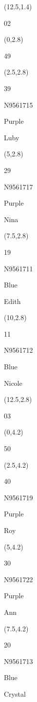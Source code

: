 \documentclass[a4paper]{article}
\newcommand{\myseat}[4]{%
\vspace{-0.1cm}
\parbox[t][2.2cm][t]{3.5cm}{
\small #1 %
\begin{description}
\vspace{-0.1cm}
\item [ID:] #2
\vspace{-0.1cm}
\item [Team:] #3 \normalsize
\vspace{-0.1cm}
\item \normalsize #4
\vspace{-0.1cm}
\end{description}
}
}
\begin{document}
\begin{CJK}{UTF8}{cyberbit}
\begin{textblock}{2.5}(12.5,1.4)
\textblockcolor{}
	\myseat{02}{}{}{}
\end{textblock}

\begin{textblock}{2.5}(0,2.8)
\textblockcolor{}
	\myseat{49}{}{}{}
\end{textblock}

\begin{textblock}{2.5}(2.5,2.8)
	\myseat{39}{N9561715}{Purple}{Luby}
\end{textblock}

\begin{textblock}{2.5}(5,2.8)
	\myseat{29}{N9561717}{Purple}{Nina}
\end{textblock}

\begin{textblock}{2.5}(7.5,2.8)
	\myseat{19}{N9561711}{Blue}{Edith}
\end{textblock}

\begin{textblock}{2.5}(10,2.8)
	\myseat{11}{N9561712}{Blue}{Nicole}
\end{textblock}

\begin{textblock}{2.5}(12.5,2.8)
\textblockcolor{}
	\myseat{03}{}{}{}
\end{textblock}

\begin{textblock}{2.5}(0,4.2)
\textblockcolor{}
	\myseat{50}{}{}{}
\end{textblock}

\begin{textblock}{2.5}(2.5,4.2)
	\myseat{40}{N9561719}{Purple}{Roy}
\end{textblock}

\begin{textblock}{2.5}(5,4.2)
	\myseat{30}{N9561722}{Purple}{Ann}
\end{textblock}

\begin{textblock}{2.5}(7.5,4.2)
	\myseat{20}{N9561713}{Blue}{Crystal}
\end{textblock}


\end{CJK}
\end{document}
